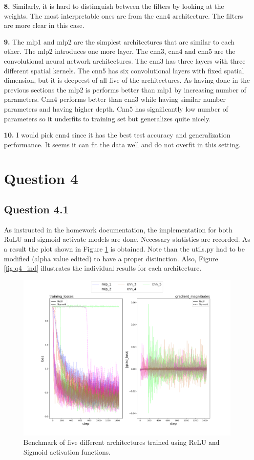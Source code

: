 \documentclass{assignment}
\begin{document}
\textbf{8.}
Similarly, it is hard to distinguish between the filters by looking at the weights. The most interpretable ones are from the cnn4 architecture. The filters are more clear in this case.

\textbf{9.}
The mlp1 and mlp2 are the simplest architectures that are similar to each other. The mlp2 introduces one more layer. The cnn3, cnn4 and cnn5 are the convolutional neural network architectures. The cnn3 has three layers with three different spatial kernels. The cnn5 has six convolutional layers with fixed spatial dimension, but it is deepeest of all five of the architectures. As having done in the previous sections the mlp2 is performs better than mlp1 by increasing number of parameters. Cnn4 performs better than cnn3 while having similar number parameters and having higher depth. Cnn5 has significantly low number of parameters so it underfits to training set but generalizes quite nicely.

\textbf{10.}
I would pick cnn4 since it has the best test accuracy and generalization performance. It seems it can fit the data well and do not overfit in this setting.

\section{Question 4}

\subsection{Question 4.1}
As instructed in the homework documentation, the implementation for both RuLU and sigmoid activate models are done. Necessary statistics are recorded. As a result the plot shown in Figure \ref{fig:q4} is obtained. Note than the utils.py had to be modified (alpha value edited) to have a proper distinction. Also, Figure \ref{fig:q4_ind} illustrates the individual results for each architecture.

\begin{figure}[htbp!]
    \centering
    \includegraphics[width=1\textwidth]{figures/part4_alpha.png}
    \caption{Benchmark of five different architectures trained using ReLU and Sigmoid activation functions.}
    \label{fig:q4}
\end{figure}
\end{document}
